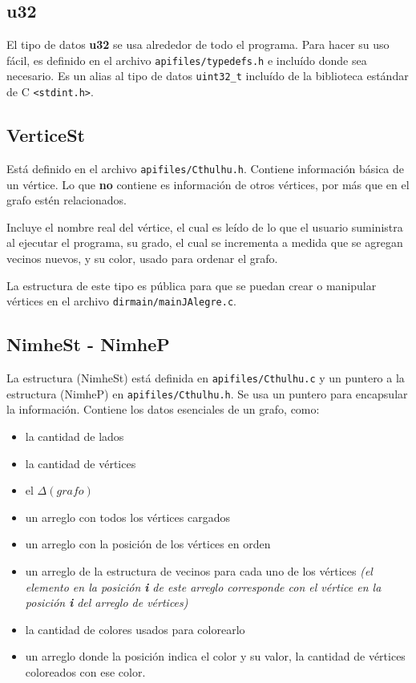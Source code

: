 \documentclass[11pt]{article}   	%
\begin{document}
\subsection{u32}
El tipo de datos \textbf{u32} se usa alrededor de todo el programa. 
Para hacer su uso fácil, es definido en el archivo \texttt{apifiles/typedefs.h}
e incluído donde sea necesario. Es un alias al tipo de datos \texttt{uint32\_t}
incluído de la biblioteca estándar de C \texttt{<stdint.h>}.

\subsection{VerticeSt}
Está definido en el archivo \texttt{apifiles/Cthulhu.h}. Contiene información
básica de un vértice. Lo que \textbf{no} contiene es información de otros vértices,
por más que en el grafo estén relacionados.

Incluye el nombre real del vértice,
el cual es leído de lo que el usuario suministra al ejecutar el programa, su grado,
el cual se incrementa a medida que se agregan vecinos nuevos, y su color, usado
para ordenar el grafo. 

La estructura de este tipo es pública para que se puedan
crear o manipular vértices en el archivo \texttt{dirmain/mainJAlegre.c}.

\subsection{NimheSt - NimheP}
La estructura (NimheSt) está definida en \texttt{apifiles/Cthulhu.c} y un
puntero a la estructura (NimheP) en \texttt{apifiles/Cthulhu.h}. Se usa un
puntero para encapsular la información. Contiene los datos esenciales de un
grafo, como:
\begin{itemize}
\item la cantidad de lados
\item la cantidad de vértices
\item el $\Delta(grafo)$
\item un arreglo con todos los vértices cargados
\item un arreglo con la posición de los vértices en orden
\item un arreglo de la estructura de vecinos para cada uno de los vértices
\emph{(el elemento en la posición \textbf{i} de este arreglo corresponde con el vértice en
la posición \textbf{i} del arreglo de vértices)}
\item la cantidad de colores usados para colorearlo
\item un arreglo donde la posición indica el color y su valor, la cantidad de
vértices coloreados con ese color.
\end{itemize}
\end{document}
